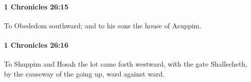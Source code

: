		\paragraph{1 Chronicles 26:15} %
			\label{1CHRONICLES-26-15}

			To Obededom southward; and to his sons the house of Asuppim.


		\paragraph{1 Chronicles 26:16} %
			\label{1CHRONICLES-26-16}

			To Shuppim and Hosah the lot came forth westward, with the gate Shallecheth, by the causeway of the going up, ward against ward.


